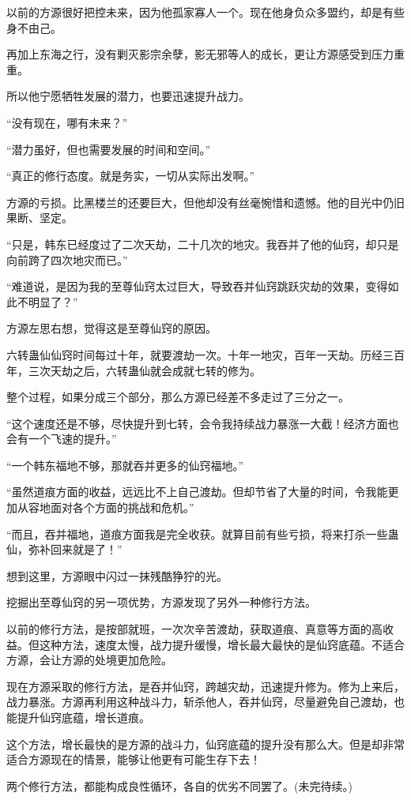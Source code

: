 \begin{this_body}
以前的方源很好把控未来，因为他孤家寡人一个。现在他身负众多盟约，却是有些身不由己。

再加上东海之行，没有剿灭影宗余孽，影无邪等人的成长，更让方源感受到压力重重。

所以他宁愿牺牲发展的潜力，也要迅速提升战力。

“没有现在，哪有未来？”

“潜力虽好，但也需要发展的时间和空间。”

“真正的修行态度。就是务实，一切从实际出发啊。”

方源的亏损。比黑楼兰的还要巨大，但他却没有丝毫惋惜和遗憾。他的目光中仍旧果断、坚定。

“只是，韩东已经度过了二次天劫，二十几次的地灾。我吞并了他的仙窍，却只是向前跨了四次地灾而已。”

“难道说，是因为我的至尊仙窍太过巨大，导致吞并仙窍跳跃灾劫的效果，变得如此不明显了？”

方源左思右想，觉得这是至尊仙窍的原因。

六转蛊仙仙窍时间每过十年，就要渡劫一次。十年一地灾，百年一天劫。历经三百年，三次天劫之后，六转蛊仙就会成就七转的修为。

整个过程，如果分成三个部分，那么方源已经差不多走过了三分之一。

“这个速度还是不够，尽快提升到七转，会令我持续战力暴涨一大截！经济方面也会有一个飞速的提升。”

“一个韩东福地不够，那就吞并更多的仙窍福地。”

“虽然道痕方面的收益，远远比不上自己渡劫。但却节省了大量的时间，令我能更加从容地面对各个方面的挑战和危机。”

“而且，吞并福地，道痕方面我是完全收获。就算目前有些亏损，将来打杀一些蛊仙，弥补回来就是了！”

想到这里，方源眼中闪过一抹残酷狰狞的光。

挖掘出至尊仙窍的另一项优势，方源发现了另外一种修行方法。

以前的修行方法，是按部就班，一次次辛苦渡劫，获取道痕、真意等方面的高收益。但这种方法，速度太慢，战力提升缓慢，增长最大最快的是仙窍底蕴。不适合方源，会让方源的处境更加危险。

现在方源采取的修行方法，是吞并仙窍，跨越灾劫，迅速提升修为。修为上来后，战力暴涨。方源再利用这种战斗力，斩杀他人，吞并仙窍，尽量避免自己渡劫，也能提升仙窍底蕴，增长道痕。

这个方法，增长最快的是方源的战斗力，仙窍底蕴的提升没有那么大。但是却非常适合方源现在的情景，能够让他更有可能生存下去！

两个修行方法，都能构成良性循环，各自的优劣不同罢了。(未完待续。)

\end{this_body}


